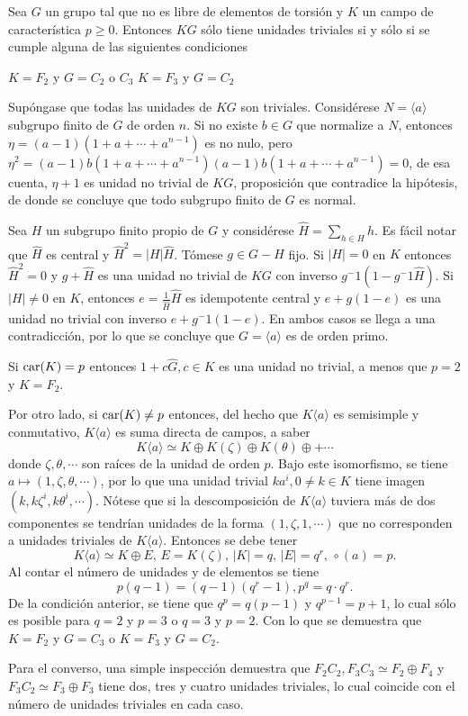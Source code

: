 \begin{proposicion}\label{prop:UnidadesTriviales}
Sea $G$ un grupo tal que no es libre de elementos de torsión y $K$ un campo de característica $p\geq 0$. Entonces $KG$ sólo tiene unidades triviales si y sólo si se cumple alguna de las siguientes condiciones
\begin{bulletList}
\newItem $K=F_2$ y $G=C_2$ o $C_3$
\newItem $K=F_3$ y $G=C_2$
\end{bulletList}
\end{proposicion}
\begin{proof*}
Supóngase que todas las unidades de $KG$ son triviales. Considérese $N=\langle a \rangle$ subgrupo finito de $G$ de orden $n$. Si no existe $b \in G$ que normalize a $N$, entonces $\eta = (a-1)(1+a+\cdots + a^{n-1})$ es no nulo, pero $\eta^2 = (a-1)b(1+a+\cdots+a^{n-1})(a-1)b(1+a+\cdots+a^{n-1})=0$, de esa cuenta, $\eta +1$ es unidad no trivial de $KG$, proposición que contradice la hipótesis, de donde se concluye que todo subgrupo finito de $G$ es normal.

Sea $H$ un subgrupo finito propio de $G$ y considérese $\hat{H} = \sum_{h \in H}h$. Es fácil notar que  $\hat{H}$ es central y $\hat{H}^2 = |H|\hat{H} $. Tómese $g \in G-H$ fijo. Si $|H| =0$ en $K$ entonces $\hat{H}^2 = 0$ y $g + \hat{H}$ es una unidad no trivial de $KG$ con inverso $g^-1(1-g^-1\hat{H})$. Si $|H| \neq 0$ en $K$, entonces $e = \frac{1}{\hat{H}}\hat{H}$ es idempotente central y $e +g(1-e)$ es una unidad no trivial con inverso $e+g^-1(1-e)$. En ambos casos se llega a una contradicción, por lo que se concluye que $G = \langle a \rangle$ es de orden primo.

Si $\operatorname{car} (K) = p$ entonces $1+c\hat{G}, c \in K$ es una unidad no trivial, a menos que $p=2$ y $K=F_2$. 

Por otro lado, si $\operatorname{car}(K) \neq p$ entonces, del hecho que $K\langle a \rangle$ es semisimple y conmutativo, $K\langle a \rangle$ es suma directa de campos, a saber
\[ K \langle a \rangle \simeq K\oplus K(\zeta) \oplus K(\theta) \oplus + \cdots \] donde $\zeta, \theta, \cdots$ son raíces de la unidad de orden $p$. Bajo este isomorfismo, se tiene $a \mapsto (1,\zeta,\theta,\cdots)$, por lo que una unidad trivial $ka^ i, 0\neq k \in K$ tiene imagen $(k,k\zeta^i,k\theta^i,\cdots)$. Nótese que si la descomposición de $K\langle a\rangle$ tuviera más de dos componentes se tendrían unidades de la forma $(1,\zeta,1,\cdots)$ que no corresponden a unidades triviales de $K\langle a \rangle$.
Entonces se debe tener \[ K\langle a \rangle \simeq K \oplus E\mbox{, } E = K(\zeta)\mbox{, } |K|=q\mbox{, } |E|=q^r\mbox{, } \circ(a) = p. \] Al contar el número de unidades y de elementos se tiene \[ p(q-1) = (q-1)(q^r-1), p^q = q\cdot q^r. \] De la condición anterior, se tiene que $q^p = q(p-1)$ y $q^{p-1} = p+1$, lo cual sólo es posible para $q=2$ y $p=3$ o $q=3$ y $p=2$. Con lo que se demuestra que $K=F_2$ y $G=C_3$ o $K=F_3$ y $G=C_2$.

Para el converso, una simple inspección demuestra que $F_2C_2, F_3C_3 \simeq F_2\oplus F_4$ y $F_3C_2 \simeq F_3 \oplus F_3$ tiene dos, tres y cuatro unidades triviales, lo cual coincide con el número de unidades triviales en cada caso. 
\end{proof*}

